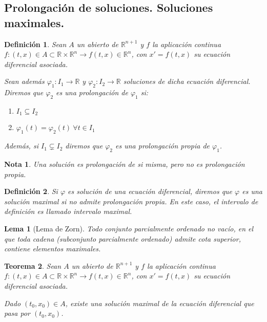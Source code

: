 \documentclass{article}
\theoremstyle{theorem-style}  %
\newtheorem{theorem}{Teorema}[section]  %
\newtheorem{lemma}[theorem]{Lema}
\theoremstyle{definition-style}
\newtheorem{definition}{Definición}[section]
\newtheorem*{note}{Nota} %
\theoremstyle{example-style}
\begin{document}
\subsection{Prolongación de soluciones. Soluciones maximales.}
\begin{definition}
	Sean $ A $ un abierto de $ \mathbb{R}^{n+1} $ y $ f $ la aplicación continua $ f:(t,x)\in A\subset \mathbb{R}\times \mathbb{R}^n \longrightarrow f(t,x)\in \mathbb{R}^n $, con $  x'=f(t,x) $ su ecuación diferencial asociada. 
	
	Sean además $ \varphi_1:I_1\longrightarrow \mathbb{R} $ y  $ \varphi_2:I_2\longrightarrow \mathbb{R} $ soluciones de dicha ecuación diferencial. Diremos que $ \varphi_2 $ es una \emph{prolongación} de $ \varphi_1 $ si:
	\begin{enumerate}
		\item $ I_1\subseteq I_2 $
		\item $ \varphi_1(t) =\varphi_2(t) \ \forall t \in I_1$
	\end{enumerate}

	Además, si $ I_1 \varsubsetneq I_2 $ diremos que $ \varphi_2 $ es una \emph{prolongación propia} de $ \varphi_1 $.
\end{definition}
\begin{note}
	Una solución es prolongación de si misma, pero no es prolongación propia.
\end{note}
\begin{definition}
	Si $ \varphi $ es solución de una ecuación diferencial, diremos que $ \varphi $ es una \emph{solución maximal} si no admite prolongación propia. En este caso, el intervalo de definición es llamado \emph{intervalo maximal}.
\end{definition}
\begin{lemma}[Lema de Zorn]
	Todo conjunto parcialmente ordenado no vacío, en el que toda cadena (subconjunto parcialmente ordenado) admite cota superior, contiene elementos maximales.
\end{lemma}
\begin{theorem}
	Sean $ A $ un abierto de $ \mathbb{R}^{n+1} $ y $ f $ la aplicación continua $ f:(t,x)\in A\subset \mathbb{R}\times \mathbb{R}^n \longrightarrow f(t,x)\in \mathbb{R}^n $, con $  x'=f(t,x) $ su ecuación diferencial asociada. 
	
	Dado $ (t_0,x_0)\in A $, existe una solución maximal de la ecuación diferencial que pasa por $ (t_0,x_0) $.
	
\end{theorem}
\end{document}
